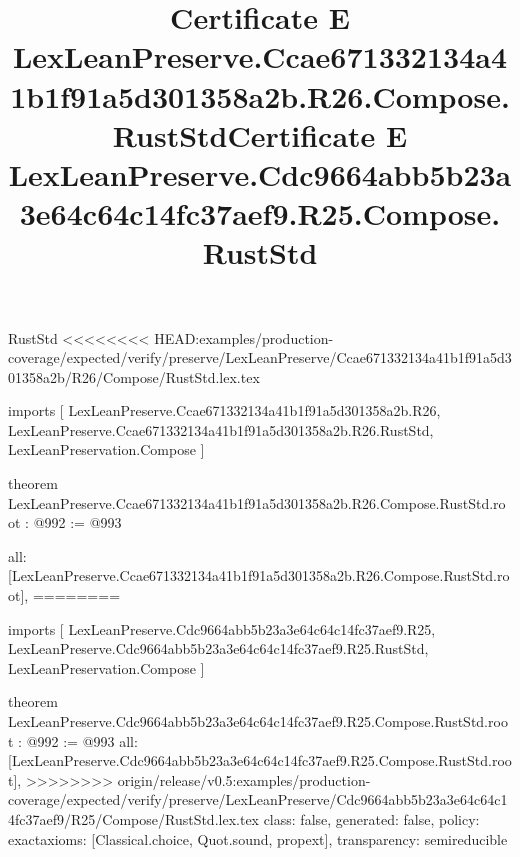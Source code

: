 \begin{lexlean}{RustStd}
<<<<<<<< HEAD:examples/production-coverage/expected/verify/preserve/LexLeanPreserve/Ccae671332134a41b1f91a5d301358a2b/R26/Compose/RustStd.lex.tex
\title{Certificate E LexLeanPreserve.Ccae671332134a41b1f91a5d301358a2b.R26.Compose.RustStd}
\begin{coremodule}
imports [
  LexLeanPreserve.Ccae671332134a41b1f91a5d301358a2b.R26,
  LexLeanPreserve.Ccae671332134a41b1f91a5d301358a2b.R26.RustStd,
  LexLeanPreservation.Compose
]

theorem LexLeanPreserve.Ccae671332134a41b1f91a5d301358a2b.R26.Compose.RustStd.root : @992 := @993 {
  all: [LexLeanPreserve.Ccae671332134a41b1f91a5d301358a2b.R26.Compose.RustStd.root],
========
\title{Certificate E LexLeanPreserve.Cdc9664abb5b23a3e64c64c14fc37aef9.R25.Compose.RustStd}
\begin{coremodule}
imports [
  LexLeanPreserve.Cdc9664abb5b23a3e64c64c14fc37aef9.R25,
  LexLeanPreserve.Cdc9664abb5b23a3e64c64c14fc37aef9.R25.RustStd,
  LexLeanPreservation.Compose
]

theorem LexLeanPreserve.Cdc9664abb5b23a3e64c64c14fc37aef9.R25.Compose.RustStd.root : @992 := @993 {
  all: [LexLeanPreserve.Cdc9664abb5b23a3e64c64c14fc37aef9.R25.Compose.RustStd.root],
>>>>>>>> origin/release/v0.5:examples/production-coverage/expected/verify/preserve/LexLeanPreserve/Cdc9664abb5b23a3e64c64c14fc37aef9/R25/Compose/RustStd.lex.tex
  class: false,
  generated: false,
  policy: exact{axioms: [Classical.choice, Quot.sound, propext]},
  transparency: semireducible
}


\end{coremodule}}
\end{coremodule}
\end{lexlean}
